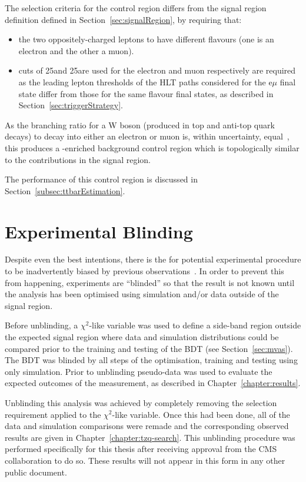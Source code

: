 The selection criteria for the \ttbar control region differs from the signal region definition defined in Section~\ref{sec:signalRegion}, by requiring that:
\begin{itemize}
\item the two oppositely-charged leptons to have different flavours (\ie one is an electron and the other a muon).
\item \pt cuts of 25\GeV and 25\GeV are used for the electron and muon respectively are required as the leading lepton \pt thresholds of the HLT paths considered for the e$\mu$ final state differ from those for the same flavour final states, as described in Section~\ref{sec:triggerStrategy}. 
\end{itemize} 

As the branching ratio for a W boson (produced in top and anti-top quark decays) to decay into either an electron or muon is, within uncertainty, equal~\cite{Tanabashi:2018oca}, this produces a \ttbar-enriched background control region which is topologically similar to the \ttbar contributions in the signal region. 

The performance of this control region is discussed in Section~\ref{subsec:ttbarEstimation}.

\section{Experimental Blinding}\label{sec:blinding}
Despite even the best intentions, there is the for potential experimental procedure to be inadvertently biased by previous observations~\cite{Roodman:2003rw}.
In order to prevent this from happening, experiments are ``blinded'' so that the result is not known until the analysis has been optimised using simulation and/or data outside of the signal region.

Before unblinding, a $\chi^{2}$-like variable was used to define a side-band region outside the expected signal region where data and simulation distributions could be compared prior to the training and testing of the BDT (see Section~\ref{sec:mvas}).
The BDT was blinded by all steps of the optimisation, training and testing using only simulation.
Prior to unblinding pseudo-data was used to evaluate the expected outcomes of the measurement, as described in Chapter~\ref{chapter:results}.

Unblinding this analysis was achieved by completely removing the selection requirement applied to the $\chi^{2}$-like variable.
Once this had been done, all of the data and simulation comparisons were remade and the corresponding observed results are given in Chapter~\ref{chapter:tzq-search}.
This unblinding procedure was performed specifically for this thesis after receiving approval from the CMS collaboration to do so.
These results will not appear in this form in any other public document.

